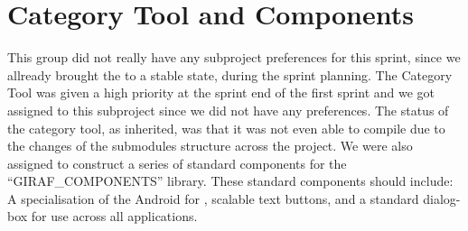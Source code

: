 \section{Category Tool and Components}

This group did not really have any subproject preferences for this sprint, since we allready brought the \launcher to a stable state, during the sprint planning. The \giraf Category Tool was given a high priority at the sprint end of the first sprint and we got assigned to this subproject since we did not have any preferences. The status of the category tool, as inherited, was that it was not even able to compile due to the changes of the submodules structure across the project. We were also assigned to construct a series of standard components for the ``GIRAF\_COMPONENTS'' library. These standard components should include: A specialisation of the Android  for \giraf, scalable text buttons, and a standard dialog-box for use across all applications. 
